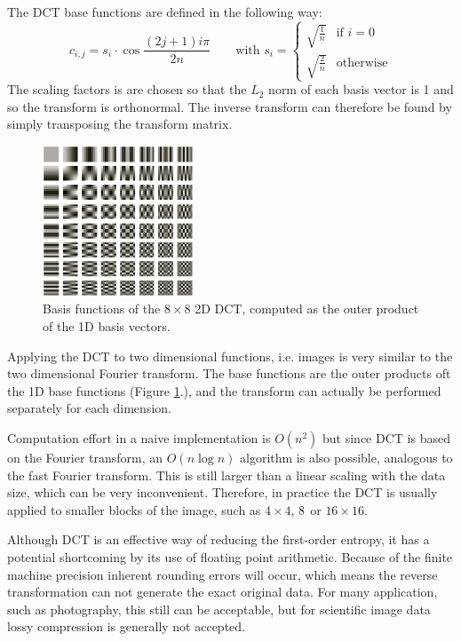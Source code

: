The DCT base functions are defined in the following way:
\begin{equation}
c_{i,j} = s_i \cdot \cos \frac{(2j+1)i\pi}{2n} \qquad \text{with } s_i = 
    \begin{cases}
        \sqrt{\frac{1}{n}} & \text{if } i=0 \\
        \sqrt{\frac{2}{n}} & \text{otherwise}
    \end{cases}
\end{equation}
The scaling factors is are chosen so that the $L_2$ norm of each basis vector is 1 and
so the transform is orthonormal. The inverse transform can therefore be found by
simply transposing the transform matrix.

\begin{figure}
\centering
\includegraphics[width=0.4\textwidth]{DCT_bases}
\caption{Basis functions of the $8 \times 8$ 2D DCT, computed as the outer product of the 1D basis vectors.}
\label{fig:DCT_bases}
\end{figure}

Applying the DCT to two dimensional functions, i.e. images is very similar to the two dimensional Fourier transform. The base functions are the outer products oft the 1D base functions (Figure \ref{fig:DCT_bases}.), and the transform can actually be performed separately for each dimension.

Computation effort in a naive implementation is $O(n^2)$ but since DCT is based on the Fourier transform, an $O(n \log n)$ algorithm is also possible, analogous to the fast Fourier transform. This is still larger than a linear scaling with the data size, which can be very inconvenient. Therefore, in practice the DCT is usually applied to smaller blocks of the image, such as $4\times4$, $8\time8$ or $16\times16$. 

Although DCT is an effective way of reducing the first-order entropy, it has a potential shortcoming by its use of floating point arithmetic. Because of the finite machine precision inherent rounding errors will occur, which means the reverse transformation can not generate the exact original data. For many application, such as photography, this still can be acceptable, but for scientific image data lossy compression is generally not accepted.


